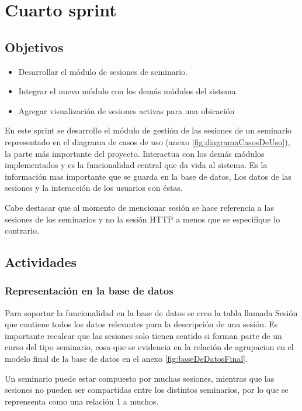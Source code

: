 \section{Cuarto sprint} %
\label{sec:cuarto_sprint}

\subsection{Objetivos}

\begin{itemize}
	\item Desarrollar el módulo de sesiones de seminario.
	\item Integrar el nuevo módulo con los demás módulos del sistema.
	\item Agregar visualización de sesiones activas para una ubicación
\end{itemize}

En este sprint se desarrollo el módulo de gestión de las sesiones de un seminario representado en el diagrama de casos de uso (anexo \ref{fig:diagramaCasosDeUso}), la parte más importante del proyecto. Interactua con los demás módulos implementados y es la funcionalidad central que da vida al sistema. Es la información mas importante que se guarda en la base de datos, Los datos de las sesiones y la interacción de los usuarios con éstas.

Cabe destacar que al momento de mencionar sesión se hace referencia a las sesiones de los seminarios y no la sesión HTTP a menos que se especifique lo contrario.

\subsection{Actividades} %
\label{sub:actividades4}

\subsubsection{Representación en la base de datos}

Para soportar la funcionalidad en la base de datos se creo la tabla llamada Sesión que contiene todos los datos relevantes para la descripción de una sesión. Es importante recalcar que las sesiones solo tienen sentido si forman parte de un curso del tipo seminario, cosa que se evidencia en la relación de agrupacion en el modelo final de la base de datos en el anexo \ref{fig:baseDeDatosFinal}. 

Un seminario puede estar compuesto por muchas sesiones, mientras que las sesiones no pueden ser compartidas entre los distintos seminarios, por lo que se reprensenta como una relación 1 a muchos. 

